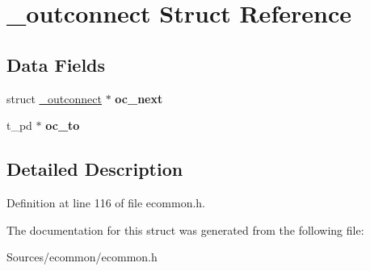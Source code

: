 \hypertarget{struct__outconnect}{\section{\-\_\-outconnect Struct Reference}
\label{struct__outconnect}
}
\subsection*{Data Fields}
\begin{DoxyCompactItemize}
\item 
\hypertarget{struct__outconnect_adbea08b41c0c8fe91283ea49fc0d4cfc}{struct \hyperlink{struct__outconnect}{\-\_\-outconnect} $\ast$ {\bfseries oc\-\_\-next}}\label{struct__outconnect_adbea08b41c0c8fe91283ea49fc0d4cfc}

\item 
\hypertarget{struct__outconnect_a9883a86f4e61a89103c9b67a9b415385}{t\-\_\-pd $\ast$ {\bfseries oc\-\_\-to}}\label{struct__outconnect_a9883a86f4e61a89103c9b67a9b415385}

\end{DoxyCompactItemize}


\subsection{Detailed Description}


Definition at line 116 of file ecommon.\-h.



The documentation for this struct was generated from the following file\-:\begin{DoxyCompactItemize}
\item 
Sources/ecommon/ecommon.\-h\end{DoxyCompactItemize}
